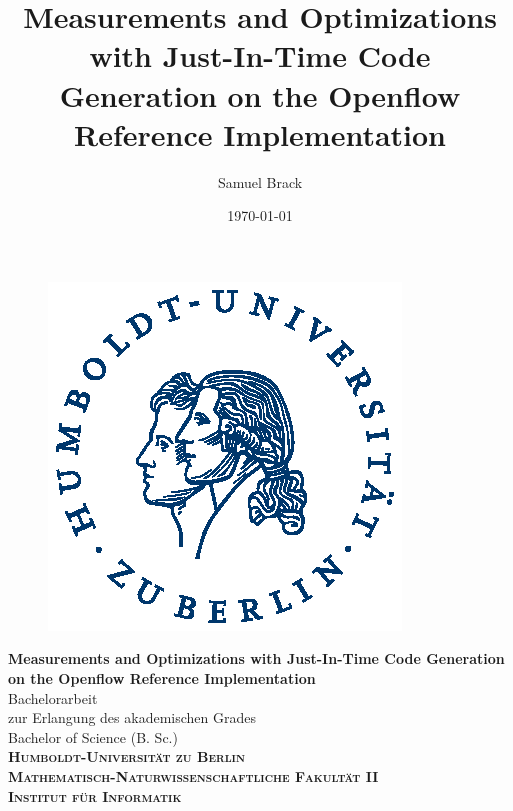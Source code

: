\documentclass[a4paper,
		12pt,
		parskip=full,
		titlepage
		]{scrartcl}
\title{Measurements and Optimizations with Just-In-Time Code Generation on the Openflow Reference Implementation}
\author{Samuel Brack}
\date{\today}
\begin{document}
\thispagestyle{empty}

\hspace{20cm}
\vspace{-3cm}

\begin{figure}[H] \hspace{11cm}
\includegraphics[width=3.2 cm]{HU_Logo}
\end{figure}
\begin{center}
  \huge{\bf Measurements and Optimizations with Just-In-Time Code Generation on the Openflow Reference Implementation} \\ %
  \vspace{1cm}
  \LARGE  Bachelorarbeit \\ %
  \vspace{1cm}
  \Large zur Erlangung des akademischen Grades \\
  Bachelor of Science (B. Sc.)\\ %
  \vspace{1.5cm}
  {\large
    \bf{
      \scshape
      Humboldt-Universit\"at zu Berlin \\
      Mathematisch-Naturwissenschaftliche Fakult\"at II \\
      Institut f\"ur Informatik\\
    }
  } 
\enlargethispage{10\baselineskip}
\end{center}
\vspace {1 cm}%
\end{document}
